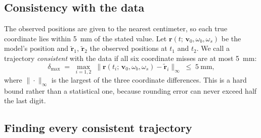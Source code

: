 \documentclass[10pt,a4paper]{article}
\begin{document}
\subsection{Consistency with the data}
\label{sec:consistency}

The observed positions are given to the nearest centimeter, so each true
coordinate lies within \SI{5}{\milli\metre} of the stated value. Let
$\bm{r}(t;\, \bm{v}_0, \omega_b, \omega_s)$ be the model's position and
$\tilde{\bm{r}}_1$, $\tilde{\bm{r}}_2$ the observed positions at $t_1$ and
$t_2$. We call a trajectory \emph{consistent} with the data if all six
coordinate misses are at most \SI{5}{\milli\metre}:
\begin{equation}
  \delta_{\max} \;=\; \max_{i = 1,2}\;
  \big\| \bm{r}(t_i;\, \bm{v}_0, \omega_b, \omega_s) - \tilde{\bm{r}}_i \big\|_\infty
  \;\le\; \SI{5}{\milli\metre},
  \label{eq:consistent}
\end{equation}
where $\|\cdot\|_\infty$ is the largest of the three coordinate differences.
This is a hard bound rather than a statistical one, because rounding error
can never exceed half the last digit.

\subsection{Finding every consistent trajectory}
\label{sec:search}
\end{document}
